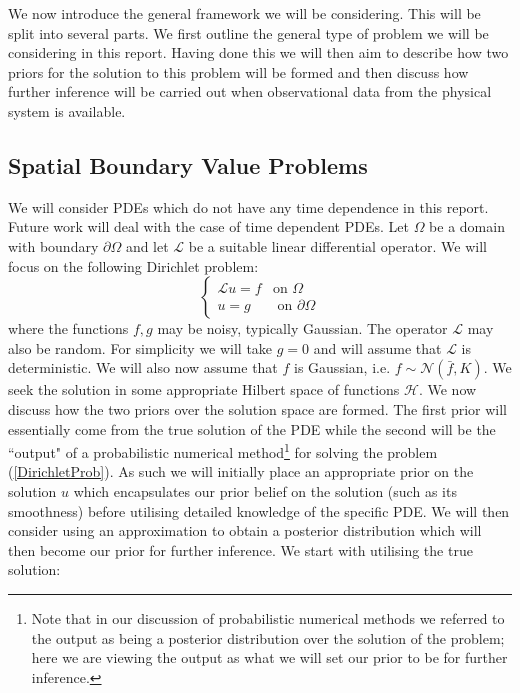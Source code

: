 We now introduce the general framework we will be considering. This will be split into several parts. We first outline the general type of problem we will be considering in this report. Having done this we will then aim to describe how two priors for the solution to this problem will be formed and then discuss how further inference will be carried out when observational data from the physical system is available.


\subsection{Spatial Boundary Value Problems}

We will consider PDEs which do not have any time dependence in this report. Future work will deal with the case of time dependent PDEs. Let $\Omega$ be a domain with boundary $\partial\Omega$ and let $\mathcal{L}$ be a suitable linear differential operator. We will focus on the following Dirichlet problem:
\begin{equation}
\label{DirichletProb}
    \left\{
    \begin{array}{cc}
        \mathcal{L}u=f & \text{on } \Omega  \\
         u = g  & \text{ on } \partial\Omega
    \end{array}
    \right.
\end{equation}
where the functions $f,g$ may be noisy, typically Gaussian. The operator $\mathcal{L}$ may also be random. For simplicity we will take $g=0$ and will assume that $\mathcal{L}$ is deterministic. We will also now assume that $f$ is Gaussian, i.e. $f\sim\mathcal{N}(\bar{f},K)$. We seek the solution in some appropriate Hilbert space of functions $\mathcal{H}$. We now discuss how the two priors over the solution space are formed. The first prior will essentially come from the true solution of the PDE while the second will be the ``output" of a probabilistic numerical method\footnote{Note that in our discussion of probabilistic numerical methods we referred to the output as being a posterior distribution over the solution of the problem; here we are viewing the output as what we will set our prior to be for further inference.} for solving the problem (\ref{DirichletProb}). As such we will initially place an appropriate prior on the solution $u$ which encapsulates our prior belief on the solution (such as its smoothness) before utilising detailed knowledge of the specific PDE. We will then consider using an approximation to obtain a posterior distribution which will then become our prior for further inference. We start with utilising the true solution:

